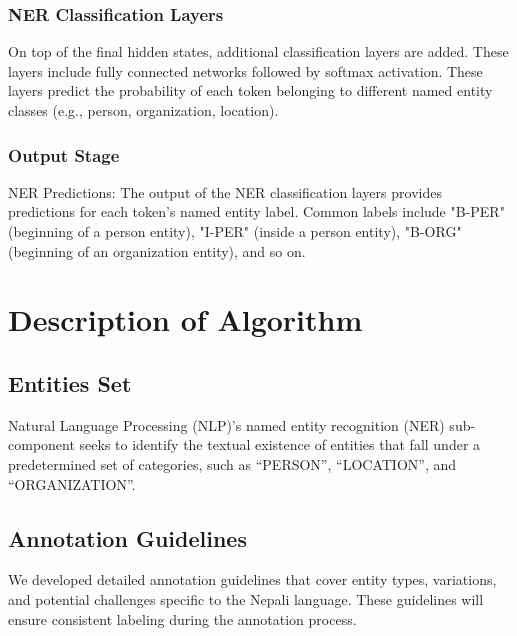 \subsubsection{NER Classification Layers} 
On top of the final hidden states, additional classification layers are added. These layers include fully connected networks followed by softmax activation. These layers predict the probability of each token belonging to different named entity classes (e.g., person, organization, location).
\subsubsection{Output Stage}
NER Predictions: The output of the NER classification layers provides predictions for each token's named entity label. Common labels include "B-PER" (beginning of a person entity), "I-PER" (inside a person entity), "B-ORG" (beginning of an organization entity), and so on.


\newpage
\section{Description of Algorithm}
\vspace{10pt} %
\subsection{Entities Set} 
Natural Language Processing (NLP)’s named entity recognition (NER) sub-component seeks to identify the textual existence of entities that fall under a predetermined set of categories, such as “PERSON”, “LOCATION”, and “ORGANIZATION”.

\subsection{Annotation Guidelines}
We developed detailed annotation guidelines that cover entity types, variations, and potential challenges specific to the Nepali language. These guidelines will ensure consistent labeling during the annotation process.\\

